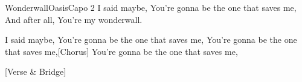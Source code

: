 \begin{song}{Wonderwall}{Oasis}{Capo 2}
I said maybe,
You're gonna be the one that saves me,
And after all,
You're my wonderwall.

I said maybe,
You're gonna be the one that saves me,
You're gonna be the one that saves me,[Chorus]
You're gonna be the one that saves me,

[Verse & Bridge]
\end{song}
